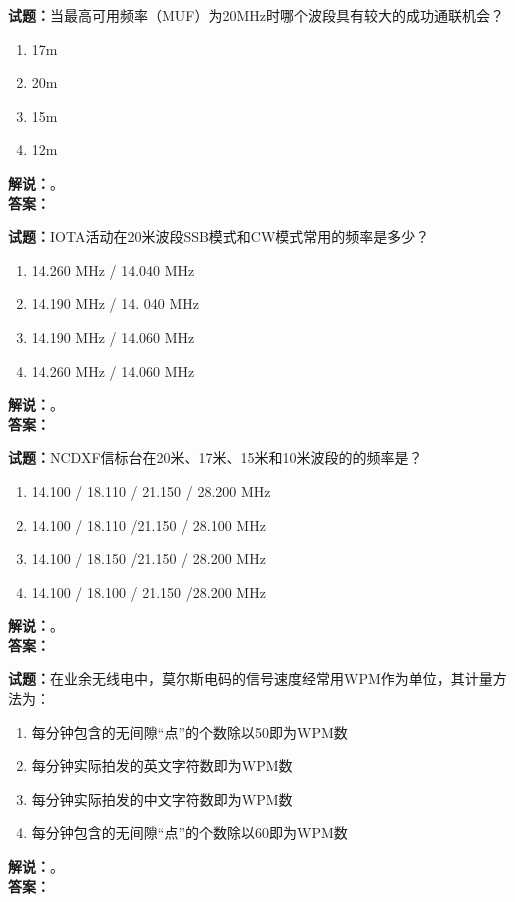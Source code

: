 \documentclass{ctexbook}
\begin{document}
\noindent\textbf{试题：}当最高可用频率（MUF）为20\unit{\MHz}时哪个波段具有较大的成功通联机会？
\begin{enumerate}[leftmargin=3em]
  \item 17m
  \item 20m
  \item 15m
  \item 12m
\end{enumerate}
\noindent\textbf{解说：}\textbf{}。\\\noindent\textbf{答案：}

\vspace{\baselineskip}

\noindent\textbf{试题：}IOTA活动在20米波段SSB模式和CW模式常用的频率是多少？
\begin{enumerate}[leftmargin=3em]
  \item 14.260 \unit{\MHz} / 14.040 \unit{\MHz}
  \item 14.190 \unit{\MHz} / 14. 040 \unit{\MHz}
  \item 14.190 \unit{\MHz} / 14.060 \unit{\MHz}
  \item 14.260 \unit{\MHz} / 14.060 \unit{\MHz}
\end{enumerate}
\noindent\textbf{解说：}\textbf{}。\\\noindent\textbf{答案：}

\vspace{\baselineskip}

\noindent\textbf{试题：}NCDXF信标台在20米、17米、15米和10米波段的的频率是？
\begin{enumerate}[leftmargin=3em]
  \item 14.100 / 18.110 / 21.150 / 28.200 \unit{\MHz}
  \item 14.100 / 18.110 /21.150 / 28.100 \unit{\MHz}
  \item 14.100 / 18.150 /21.150 / 28.200 \unit{\MHz}
  \item 14.100 / 18.100 / 21.150 /28.200 \unit{\MHz}
\end{enumerate}
\noindent\textbf{解说：}\textbf{}。\\\noindent\textbf{答案：}

\vspace{\baselineskip}

\noindent\textbf{试题：}在业余无线电中，莫尔斯电码的信号速度经常用WPM作为单位，其计量方法为：
\begin{enumerate}[leftmargin=3em]
  \item 每分钟包含的无间隙“点”的个数除以50即为WPM数
  \item 每分钟实际拍发的英文字符数即为WPM数
  \item 每分钟实际拍发的中文字符数即为WPM数
  \item 每分钟包含的无间隙“点”的个数除以60即为WPM数
\end{enumerate}
\noindent\textbf{解说：}\textbf{}。\\\noindent\textbf{答案：}
\end{document}
